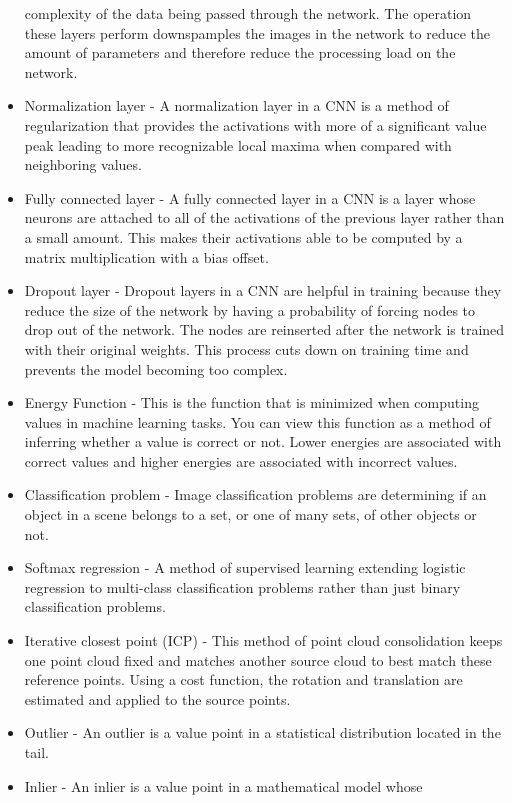 \documentclass[12pt]{article}
\begin{document}
\begin{itemize}
  complexity of the data being passed through the network. The operation
  these layers perform downspamples the images in the network to reduce
  the amount of parameters and therefore reduce the processing load on
  the network.
\item
  Normalization layer - A normalization layer in a CNN is a method of
  regularization that provides the activations with more of a
  significant value peak leading to more recognizable local maxima when
  compared with neighboring values.
\item
  Fully connected layer - A fully connected layer in a CNN is a layer
  whose neurons are attached to all of the activations of the previous
  layer rather than a small amount. This makes their activations able to
  be computed by a matrix multiplication with a bias offset.
\item
  Dropout layer - Dropout layers in a CNN are helpful in training
  because they reduce the size of the network by having a probability of
  forcing nodes to drop out of the network. The nodes are reinserted
  after the network is trained with their original weights. This process
  cuts down on training time and prevents the model becoming too
  complex.
\item
  Energy Function - This is the function that is minimized when
  computing values in machine learning tasks. You can view this function
  as a method of inferring whether a value is correct or not. Lower
  energies are associated with correct values and higher energies are
  associated with incorrect values.
\item
  Classification problem - Image classification problems are determining
  if an object in a scene belongs to a set, or one of many sets, of
  other objects or not.
\item
  Softmax regression - A method of supervised learning extending
  logistic regression to multi-class classification problems rather than
  just binary classification problems.
\item
  Iterative closest point (ICP) - This method of point cloud
  consolidation keeps one point cloud fixed and matches another source
  cloud to best match these reference points. Using a cost function, the
  rotation and translation are estimated and applied to the source
  points.
\item
  Outlier - An outlier is a value point in a statistical distribution
  located in the tail.
\item
  Inlier - An inlier is a value point in a mathematical model whose

\end{itemize}
\end{document}
